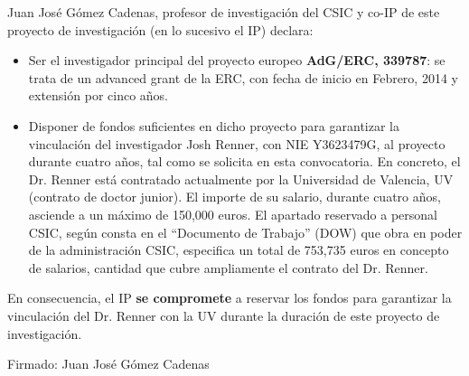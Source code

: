 \documentclass[a4paper,11pt,oneside]{article}
\begin{document}


%

Juan José Gómez Cadenas, profesor de investigación del CSIC y co-IP de este proyecto de investigación (en lo sucesivo el IP) declara: 

\begin{itemize}

\item Ser el investigador principal del proyecto europeo {\bf AdG/ERC, 339787}: se trata de un advanced grant de la ERC, con fecha de inicio en Febrero, 2014 y extensión por cinco años.  
% 
\item Disponer de fondos suficientes en dicho proyecto para garantizar la vinculación del investigador Josh Renner, con NIE Y3623479G, al proyecto durante cuatro años, tal como se solicita en esta convocatoria.  En concreto, el Dr. Renner está contratado actualmente por la Universidad de Valencia, UV (contrato de doctor junior). El importe de su salario, durante cuatro años, asciende a un máximo de 150,000 euros. El apartado reservado a personal CSIC, según consta en el ``Documento de Trabajo'' (DOW) que obra en poder de la administración CSIC, especifica un total de 753,735 euros en concepto de salarios, cantidad que cubre ampliamente el contrato del Dr. Renner.
\end{itemize}
%

En consecuencia, el IP {\bf se compromete} a reservar los fondos para garantizar la   vinculación del Dr. Renner con la UV durante la duración de este proyecto de investigación. 


Firmado: Juan José Gómez Cadenas
\end{document}
